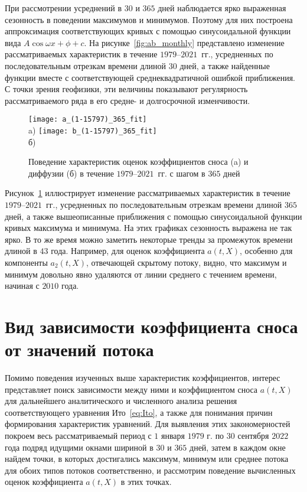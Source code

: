 При рассмотрении усреднений в $30$ и $365$ дней наблюдается ярко выраженная сезонность в поведении максимумов и минимумов. Поэтому для них построена аппроксимация соответствующих кривых с помощью синусоидальной функции вида $A \cos{\omega x + \phi} + c$. На рисунке~\ref{fig:ab_monthly} представлено изменение рассматриваемых характеристик в течение $1979$--$2021$~гг., усредненных по последовательным отрезкам времени длиной $30$ дней, а также найденные функции вместе с соответствующей среднеквадратичной ошибкой приближения. С точки зрения геофизики, эти величины показывают регулярность рассматриваемого ряда в его средне- и долгосрочной изменчивости.

\begin{figure}[h!]
	\centering
	\texttt{[image: a\_(1-15797)\_365\_fit]}\\
	a)
	\texttt{[image: b\_(1-15797)\_365\_fit]}\\
	б)
	\caption{Поведение характеристик оценок коэффициентов сноса (a) и диффузии (б) в течение $1979$--$2021$~гг. с шагом в $365$ дней}
	\label{fig:ab_year}
\end{figure}

Рисунок~\ref{fig:ab_year} иллюстрирует изменение рассматриваемых характеристик в течение $1979$--$2021$~гг., усредненных по последовательным отрезкам времени длиной $365$ дней, а также вышеописанные приближения с помощью синусоидальной функции кривых максимума и минимума. На этих графиках сезонность выражена не так ярко. В то же время можно заметить некоторые тренды за промежуток времени длиной в $43$ года. Например, для оценок коэффициента $a(t,X)$, особенно для компоненты $a_2(t,X)$, отвечающей скрытому потоку, видно, что максимум и минимум довольно явно удаляются от линии среднего с течением времени, начиная с $2010$ года. 


\section{Вид зависимости коэффициента сноса от значений потока}
Помимо поведения изученных выше характеристик коэффициентов, интерес представляет поиск зависимости между ними и коэффициентом сноса $a(t,X)$ для дальнейшего аналитического и численного анализа решения соответствующего уравнения Ито~\eqref{eq:Ito}, а также для понимания причин формирования характеристик уравнений. Для выявления этих закономерностей покроем весь рассматриваемый период с $1$ января $1979$ г. по $30$ сентября $2022$ года подряд идущими окнами шириной в $30$ и $365$ дней, затем в каждом окне найдем точки, в которых достигались максимум, минимум или среднее потока для обоих типов потоков соответственно, и рассмотрим поведение вычисленных оценок коэффициента $a(t,X)$ в этих точках.

